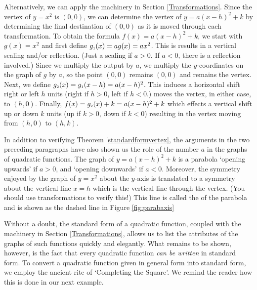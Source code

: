 \smallskip

Alternatively, we can apply the machinery in Section \ref{Transformations}. Since the vertex of $y = x^2$ is $(0,0)$, we can determine the vertex of $y = a(x-h)^2+k$ by determining the final destination of $(0,0)$ as it is moved through each transformation. To obtain the formula $f(x)= a(x-h)^2+k$, we start with $g(x)=x^2$ and first define $g_{\mbox{\tiny$1$}}(x) = a g(x) = ax^2$.  This is results in a  vertical scaling and/or reflection. (Just a scaling if $a>0$.  If $a<0$, there is a reflection involved.)  Since we multiply the output by $a$, we multiply the $y$-coordinates on the graph of $g$  by $a$, so the point $(0,0)$ remains $(0,0)$ and remains the vertex.  Next, we define $g_{\mbox{\tiny$2$}}(x) = g_{\mbox{\tiny$1$}}(x-h) = a(x-h)^2$.  This induces a horizontal shift right or left $h$ units (right if $h>0$, left if $h<0$.) moves the vertex, in either case,  to $(h,0)$.  Finally, $f(x) = g_{\mbox{\tiny$2$}}(x)+k = a(x-h)^2+k$ which effects a vertical shift up or down $k$ units (up if $k>0$, down if $k<0$) resulting in the vertex moving from $(h,0)$ to $(h,k)$.

\smallskip

In addition to verifying Theorem \ref{standardformvertex},  the arguments in the two preceding paragraphs have also shown us the role of the number $a$ in the graphs of quadratic functions. The graph of $y = a(x-h)^2 + k$ is a parabola `opening upwards' if $a > 0$, and `opening downwards' if $a < 0$. Moreover, the symmetry enjoyed by the graph of $y = x^2$ about the $y$-axis is translated to a symmetry about the vertical line $x=h$ which is the vertical line through the vertex. (You should use transformations to verify this!) This line is called the  of the parabola and is shown as the dashed line in Figure \ref{fig:parabaxis}


Without a doubt, the standard form of a quadratic function, coupled with the machinery in Section \ref{Transformations}, allows us to list the attributes of the graphs of such functions quickly and elegantly.  What remains to be shown, however, is the fact that every quadratic function \textit{can be written} in standard form.  To convert a quadratic function given in general form into standard form, we employ the ancient rite of `Completing the Square'.  We remind the reader how this is done in our next example.


